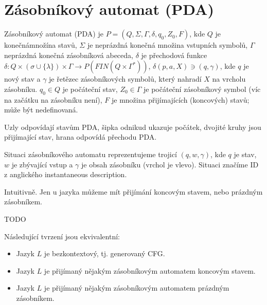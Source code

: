 \documentclass[12pt]{article}                   %
\begin{document}


\section{Zásobníkový automat (PDA)}
    \begin{definice}
        Zásobníkový automat (PDA) je $P = (Q, \Sigma, \Gamma, \delta, q_0, Z_0, F)$, kde $Q$ je konečnámnožína stavů, $\Sigma$ je neprázdná konečná množina vstupních symbolů, $\Gamma$ neprázdná konečná zásobníková abeceda, $\delta$ je přechodová funkce $\delta: Q \times (\sigma \cup \{\lambda\})\times \Gamma \rightarrow P(FIN(Q \times \Gamma^*))$, $\delta(p, a, X) \ni (q, \gamma)$, kde $q$ je nový stav a $\gamma$ je řetězec zásobníkových symbolů, který nahradí $X$ na vrcholu zásobníku. $q_0 \in Q$ je počáteční stav, $Z_0 \in \Gamma$ je počáteční zásobníkový symbol (víc na začátku na zásobníku není), $F$ je množina přijímajících (koncových) stavů; může být nedefinovaná.
    \end{definice}

    \begin{definice}
        Uzly odpovídají stavům PDA, šipka odnikud ukazuje počátek, dvojité kruhy jsou přijímající stav, hrana odpovídá přechodu PDA.
    \end{definice}

    \begin{definice}
        Situaci zásobníkového automatu reprezentujeme trojicí $(q, w, \gamma)$, kde $q$ je stav, $w$ je zbývající vstup a $\gamma$ je obsah zásobníku (vrchol je vlevo). Situaci značíme ID z anglického instantaneous description.
    \end{definice}

    \begin{definice}
        Intuitivně. Jen u jazyka můžeme mít přijímání koncovým stavem, nebo prázdným zásobníkem.
    \end{definice}

    TODO

    \begin{veta}
        Následující tvrzení jsou ekvivalentní:
        
        \begin{itemize}
            \item Jazyk $L$ je bezkontextový, tj. generovaný CFG.
            \item Jazyk $L$ je přijímaný nějakým zásobníkovým automatem koncovým stavem.
            \item Jazyk $L$ je přijímaný nějakým zásobníkovým automatem prázdným zásobníkem.
        \end{itemize}
    \end{veta}
\end{document}
